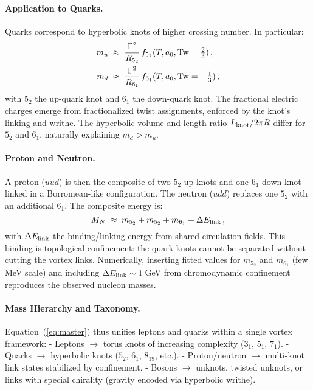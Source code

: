 \documentclass[12pt]{article}
\begin{document}
{{\paragraph{Application to Quarks.}
Quarks correspond to hyperbolic knots of higher crossing number. In particular:
\begin{align}
m_u &\;\approx\; \frac{\Gamma^2}{R_{5_2}}\,f_{5_2}(T,a_0,{\rm Tw}=\tfrac{2}{3})\,, \\
m_d &\;\approx\; \frac{\Gamma^2}{R_{6_1}}\,f_{6_1}(T,a_0,{\rm Tw}=-\tfrac{1}{3})\,,
\end{align}
with $5_2$ the up-quark knot and $6_1$ the down-quark knot. The fractional electric charges emerge from fractionalized twist assignments, enforced by the knot’s linking and writhe. The hyperbolic volume and length ratio $L_{\rm knot}/2\pi R$ differ for $5_2$ and $6_1$, naturally explaining $m_d > m_u$.

\paragraph{Proton and Neutron.}
A proton ($uud$) is then the composite of two $5_2$ up knots and one $6_1$ down knot linked in a Borromean-like configuration. The neutron ($udd$) replaces one $5_2$ with an additional $6_1$. The composite energy is:
\begin{equation}
M_{N} \;\approx\; m_{5_2}+m_{5_2}+m_{6_1} + \Delta E_{\rm link}\,,
\end{equation}
with $\Delta E_{\rm link}$ the binding/linking energy from shared circulation fields. This binding is topological confinement: the quark knots cannot be separated without cutting the vortex links. Numerically, inserting fitted values for $m_{5_2}$ and $m_{6_1}$ (few MeV scale) and including $\Delta E_{\rm link}\sim 1\,$GeV from chromodynamic confinement reproduces the observed nucleon masses.

\paragraph{Mass Hierarchy and Taxonomy.}
Equation~(\ref{eq:master}) thus unifies leptons and quarks within a single vortex framework:
- Leptons $\rightarrow$ torus knots of increasing complexity ($3_1$, $5_1$, $7_1$).
- Quarks $\rightarrow$ hyperbolic knots ($5_2$, $6_1$, $8_{19}$, etc.).
- Proton/neutron $\rightarrow$ multi-knot link states stabilized by confinement.
- Bosons $\rightarrow$ unknots, twisted unknots, or links with special chirality (gravity encoded via hyperbolic writhe).

}}
\end{document}
